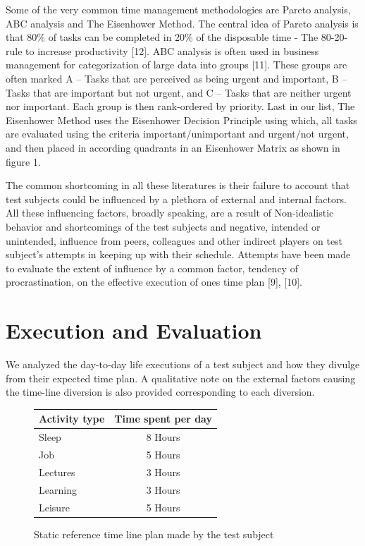 \documentclass[conference]{IEEEtran}
\begin{document}
Some of the very common time management methodologies are Pareto analysis, ABC analysis and The Eisenhower Method. The central idea of Pareto analysis is that 80\% of tasks can be completed in 20\% of the disposable time - The 80-20-rule to increase productivity [12]. ABC analysis is often used in business management for categorization of large data into groups [11]. These groups are often marked A – Tasks that are perceived as being urgent and important, B – Tasks that are important but not urgent, and C – Tasks that are neither urgent nor important. Each group is then rank-ordered by priority. Last in our list, The Eisenhower Method uses the Eisenhower Decision Principle using which, all tasks are evaluated using the criteria important/unimportant and urgent/not urgent, and then placed in according quadrants in an Eisenhower Matrix as shown in figure 1.


The common shortcoming in all these literatures is their failure to account that test subjects could be influenced by a plethora of external and internal factors. All these influencing factors, broadly speaking, are a result of Non-idealistic behavior and shortcomings of the test subjects and negative, intended or unintended, influence from peers, colleagues and other indirect players on test subject's attempts in keeping up with their schedule. Attempts have been made to evaluate the extent of influence by a common factor, tendency of procrastination, on the effective execution of ones time plan [9], [10].


\section{Execution and Evaluation}
We analyzed the day-to-day life executions of a test subject and how they divulge from their expected time plan. A qualitative note on the external factors causing the time-line diversion is also provided corresponding to each diversion.


\begin{figure}[hb]
  \centering
	  \begin{tabular}{ | l | c | }
		\hline
		\textbf{Activity type} 	& \textbf{Time spent per day} 	\\ \hline
		Sleep					& 	8 Hours						\\ \hline
		Job						& 	5 Hours						\\ \hline
		Lectures				& 	3 Hours						\\ \hline
		Learning				& 	3 Hours						\\ \hline
		Leisure					& 	5 Hours						\\ \hline
	  \end{tabular} 
  \caption[]
   {Static reference time line plan made by the test subject}
\end{figure}
\end{document}

